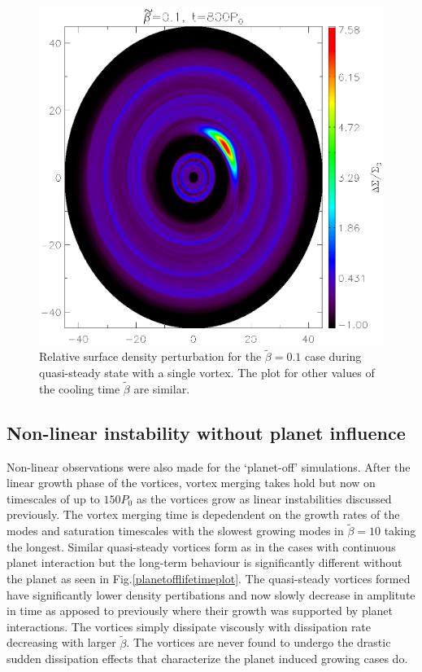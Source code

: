 \begin{figure}
  \includegraphics[width=\linewidth,height=\linewidth]{figures/vortex2D}
  \caption{Relative surface density perturbation for the
    $\tilde\beta=0.1$ case during quasi-steady state with a single
    vortex. The plot for other values of the cooling time $\tilde{\beta}$ are
    similar.%
    \label{Vortex2D}} 
\end{figure}

\subsection{Non-linear instability without planet influence} \label{nonlinearplanetoff}
Non-linear observations were also made for the `planet-off' simulations.
After the linear growth phase of the vortices, vortex merging takes hold but
 now on timescales of up to $150P_0$ as the vortices grow as linear
 instabilities discussed previously. The vortex merging time is depedendent on
 the growth rates of the modes and saturation timescales with the
slowest growing modes in $\tilde\beta=10$ taking the longest. Similar
 quasi-steady vortices form as in the cases with continuous planet interaction
but the long-term behaviour is significantly
 different without the planet as seen in Fig.\ref{planetofflifetimeplot}.
The quasi-steady vortices formed have significantly lower density pertibations
and now slowly decrease in amplitute in time as apposed to previously
where their growth was supported by planet interactions. The vortices simply
dissipate viscously with dissipation rate decreasing with larger $\tilde\beta$.
The vortices are never found to undergo the drastic sudden dissipation effects
that characterize the planet induced growing cases do.

